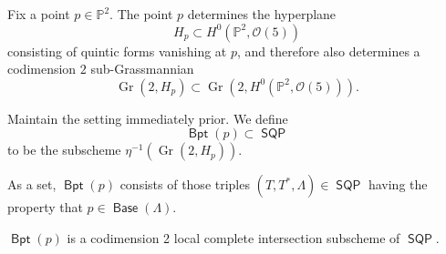 \documentclass{article}
\renewcommand{\P}{\mathbb{P}}
\renewcommand{\O}{\mathcal{O}}
\DeclareMathOperator{\SQP}{\mathsf{SQP}}
\DeclareMathOperator{\Gr}{Gr}
\DeclareMathOperator{\BP}{\mathsf{Bpt}}
\DeclareMathOperator{\Base}{\mathsf{Base}}
\begin{document}
Fix a point $p \in \P^{2}$.  The point $p$ determines the hyperplane
\[H_{p} \subset H^{0}(\P^{2}, \O(5))\] consisting of quintic forms vanishing at $p$,
and therefore also determines a codimension $2$ sub-Grassmannian
\[\Gr\left(2, H_{p}\right) \subset \Gr\left(2, H^{0}\left(\P^{2}, \O(5)\right)\right).\]

\begin{definition}
  \label{definition:basepointp} Maintain the setting immediately
  prior. We define \[\BP (p) \subset \SQP\] to be
  the subscheme $\eta^{-1}\left(\Gr(2,H_p)\right)$.
\end{definition}
As a set, $\BP (p)$ consists of those triples
$(T,T^{*},\Lambda) \in \SQP$ having the property that $p \in \Base(\Lambda)$.

\begin{proposition}
  \label{proposition:BPp}
  $\BP (p)$ is a codimension 2 local complete intersection subscheme
  of $\SQP$.
\end{proposition}
\end{document}

